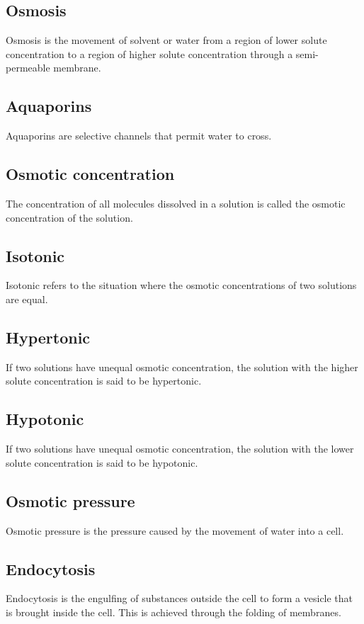 \documentclass[11pt]{article}
\begin{document}
\subsection{Osmosis}
\label{sec:orge34fd0a}
Osmosis is the movement of solvent or water from a region of lower solute concentration to a region of higher solute concentration through a semi-permeable membrane.

\subsection{Aquaporins}
\label{sec:org876cb91}
Aquaporins are selective channels that permit water to cross.

\subsection{Osmotic concentration}
\label{sec:org1e25146}
The concentration of all molecules dissolved in a solution is called the osmotic concentration of the solution.

\subsection{Isotonic}
\label{sec:org0c417d1}
Isotonic refers to the situation where the osmotic concentrations of two solutions are equal.

\subsection{Hypertonic}
\label{sec:org02fa183}
If two solutions have unequal osmotic concentration, the solution with the higher solute concentration is said to be hypertonic.

\subsection{Hypotonic}
\label{sec:org664c246}
If two solutions have unequal osmotic concentration, the solution with the lower solute concentration is said to be hypotonic.

\subsection{Osmotic pressure}
\label{sec:org2d384c6}
Osmotic pressure is the pressure caused by the movement of water into a cell.

\subsection{Endocytosis}
\label{sec:org7dada5b}
Endocytosis is the engulfing of substances outside the cell to form a vesicle that is brought inside the cell. This is achieved through the folding of membranes.
\end{document}
